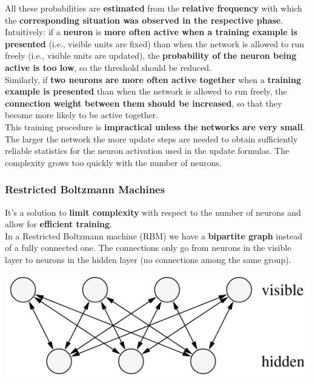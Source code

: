All these probabilities are \textbf{estimated} from the \textbf{relative frequency} with which the \textbf{corresponding situation was observed in the respective phase}.\\

Intuitively: if a \textbf{neuron} is \textbf{more often active when a training example is presented} (i.e., visible units are fixed) than when the network is allowed to run freely (i.e., visible units are updated), the \textbf{probability of the neuron being active is too low}, so the threshold should be reduced.\\
Similarly, if \textbf{two neurons are more often active together} when a \textbf{training example is presented} than when the network is allowed to run freely, the \textbf{connection weight between them should be increased}, so that they become more likely to be active together. \\

This training procedure is \textbf{impractical unless the networks are very small}. The larger the network the more update steps are needed to obtain sufficiently reliable statistics for the neuron activation used in the update formulas. The complexity grows too quickly with the number of neurons.\\

\newpage

\subsubsection{Restricted Boltzmann Machines}
It's a solution to \textbf{limit complexity} with respect to the number of neurons and allow for \textbf{efficient training}.\\

In a Restricted Boltzmann machine (RBM) we have a \textbf{bipartite graph} instead of a fully connected one. The connections only go from neurons in the visible layer to neurons in the hidden layer (no connections among the same group).

\begin{center}
	\includegraphics[width=0.65\linewidth]{img/NN/RBM1}
\end{center}

